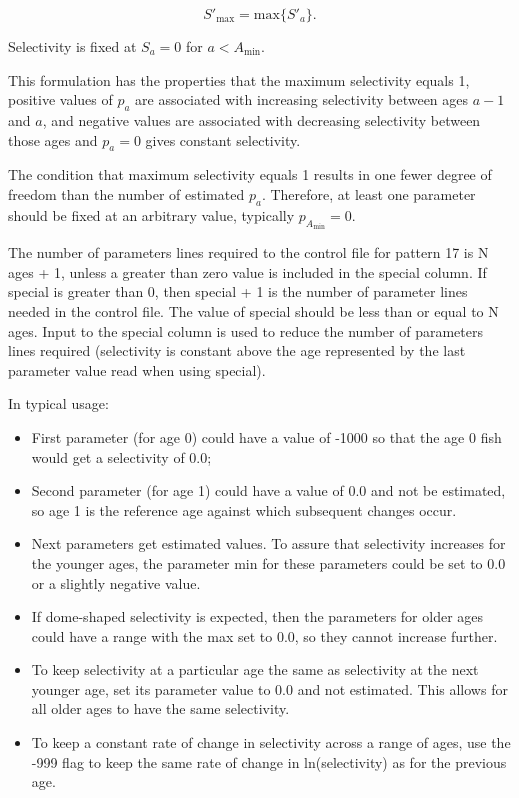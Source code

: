 	\begin{equation}
	S'_{\text{max}} = \mbox{max} \{S'_a\}.
	\end{equation}

Selectivity is fixed at $S_a = 0$ for $a < A_{\text{min}}$. 
	
This formulation has the properties that the maximum selectivity equals 1, positive values of $p_a$ are associated with increasing selectivity between ages $a-1$ and $a$, and negative values are associated with decreasing selectivity between those ages and $p_a = 0$ gives constant selectivity.
	
The condition that maximum selectivity equals 1 results in one fewer degree of freedom than the number of estimated $p_a$. Therefore, at least one parameter should be fixed at an arbitrary value, typically $p_{A_{\text{min}}}=0$.

The number of parameters lines required to the control file for pattern 17 is N ages + 1, unless a greater than zero value is included in the special column. If special is greater than 0, then special + 1 is the number of parameter lines needed in the control file. The value of special should be less than or equal to N ages. Input to the special column is used to reduce the number of parameters lines required (selectivity is constant above the age represented by the last parameter value read when using special). 
	
In typical usage:
	\begin{itemize}
		\item First parameter (for age 0) could have a value of -1000 so that the age 0 fish would get a selectivity of 0.0;
		\item Second parameter (for age 1) could have a value of 0.0 and not be estimated, so age 1 is the reference age against which subsequent changes occur.
		\item Next parameters get estimated values. To assure that selectivity increases for the younger ages, the parameter min for these parameters could be set to 0.0 or a slightly negative value.
		\item If dome-shaped selectivity is expected, then the parameters for older ages could have a range with the max set to 0.0, so they cannot increase further.
		\item To keep selectivity at a particular age the same as selectivity at the next younger age, set its parameter value to 0.0 and not estimated. This allows for all older ages to have the same selectivity.
		\item To keep a constant rate of change in selectivity across a range of ages, use the -999 flag to keep the same rate of change in ln(selectivity) as for the previous age.
	\end{itemize}

